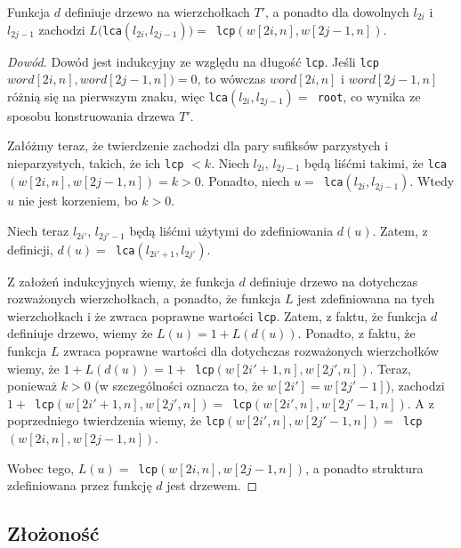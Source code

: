 \begin{theorem}{}{}
Funkcja $d$ definiuje drzewo na wierzchołkach $T'$, a ponadto dla dowolnych $l_{2i}$ i $l_{2j-1}$ zachodzi $L($\verb|lca|$(l_{2i}, l_{2j-1})) = $\verb| lcp|$(w[2i,n], w[2j-1,n])$.
\end{theorem}
\begin{proof}[Dowód]
Dowód jest indukcyjny ze względu na długość \verb|lcp|. Jeśli \verb|lcp|$word[2i, n], word[2j-1,n]) = 0$, to wówczas $word[2i, n]$ i $word[2j-1,n]$ różnią się na pierwszym znaku, więc \verb|lca|$(l_{2i}, l_{2j-1}) = $\verb| root|, co wynika ze sposobu konstruowania drzewa $T'$.

Załóżmy teraz, że twierdzenie zachodzi dla pary sufiksów parzystych i nieparzystych, takich, że ich \verb|lcp| $< k$. Niech $l_{2i},\,l_{2j-1}$ będą liśćmi takimi, że \verb|lca|$(w[2i,n], w[2j-1,n]) = k > 0$. Ponadto, niech $u = $\verb| lca|$(l_{2i}, l_{2j-1})$. Wtedy $u$ nie jest korzeniem, bo $k > 0$.

Niech teraz $l_{2i'}$, $l_{2j'-1}$ będą liśćmi użytymi do zdefiniowania $d(u)$. Zatem, z definicji, $d(u) = $\verb| lca|$(l_{2i'+1},l_{2j'})$.

Z założeń indukcyjnych wiemy, że funkcja $d$ definiuje drzewo na dotychczas rozważonych wierzchołkach, a ponadto, że funkcja $L$ jest zdefiniowana na tych wierzchołkach i że zwraca poprawne wartości \verb|lcp|. Zatem, z faktu, że funkcja $d$ definiuje drzewo, wiemy że $L(u) = 1 + L(d(u))$. Ponadto, z faktu, że funkcja $L$ zwraca poprawne wartości dla dotychczas rozważonych wierzchołków wiemy, że $1 + L(d(u)) = 1 + $\verb| lcp|$(w[2i'+1,n],w[2j',n])$. Teraz, ponieważ $k > 0$ (w szczególności oznacza to, że $w[2i'] = w[2j'-1]$), zachodzi $1 + $\verb| lcp|$(w[2i'+1,n],w[2j',n]) = $\verb| lcp|$(w[2i',n],w[2j'-1,n])$. A z poprzedniego twierdzenia wiemy, że \verb|lcp|$(w[2i',n],w[2j'-1,n]) = $\verb| lcp|$(w[2i,n],w[2j-1,n])$.

Wobec tego, $L(u) = $\verb| lcp|$(w[2i,n],w[2j-1,n])$, a ponadto struktura zdefiniowana przez funkcję $d$ jest drzewem.
\end{proof}

\subsection{Złożoność}
